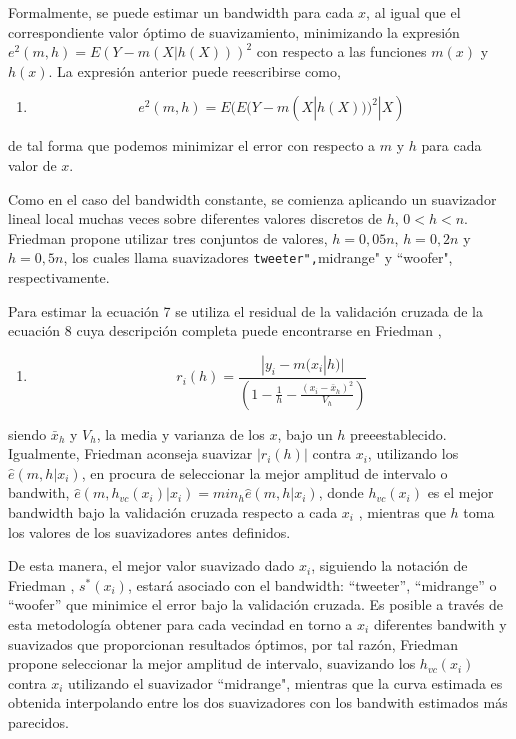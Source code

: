 \documentclass[
  12pt,
]{krantz}
\providecommand{\tightlist}{%
  \setlength{\itemsep}{0pt}\setlength{\parskip}{0pt}}
\begin{document}
Formalmente, se puede estimar un bandwidth para cada \(x\), al igual que el correspondiente valor óptimo de suavizamiento, minimizando la expresión \(e^{2}(m,h) = E(Y - m(X|h(X)))^2\) con respecto a las funciones \(m(x)\) y \(h(x)\). La expresión anterior puede reescribirse como,

\begin{enumerate}
\def\labelenumi{(\arabic{enumi})}
\setcounter{enumi}{6}
\tightlist
\item
  \[
  e^{2}(m,h) = E(E(Y - m(X|h(X)))^2|X)
  \]
\end{enumerate}

de tal forma que podemos minimizar el error con respecto a \(m\) y \(h\) para cada valor de \(x\).

Como en el caso del bandwidth constante, se comienza aplicando un suavizador lineal local muchas veces sobre diferentes valores discretos de \(h\), \(0 < h < n\). Friedman \cite{F} propone utilizar tres conjuntos de valores, \(h=0,05n\), \(h=0,2n\) y \(h=0,5n\), los cuales llama suavizadores \texttt{tweeter",}midrange" y ``woofer", respectivamente.

Para estimar la ecuación 7 se utiliza el residual de la validación cruzada de la ecuación 8 cuya descripción completa puede encontrarse en Friedman \cite{F},

\begin{enumerate}
\def\labelenumi{(\arabic{enumi})}
\setcounter{enumi}{7}
\tightlist
\item
  \[
   r_{i}(h)= \frac{|y_{i}-m(x_{i}|h)|}{\left(1-\frac{1}{h}-\frac{(x_{i}-\bar{x}_{h})^2}{V_{h}}\right)}  
  \]
\end{enumerate}

siendo \(\bar{x}_{h}\) y \(V_{h}\), la media y varianza de los \(x\), bajo un \(h\) preeestablecido. Igualmente, Friedman \cite{F} aconseja suavizar \(|r_{i}(h)|\) contra \(x_{i}\), utilizando los \(\hat{e}(m, h|x_{i})\), en procura de seleccionar la mejor amplitud de intervalo o bandwith, \(\hat{e}(m, h_{vc}(x_{i})|x_{i})=min_{h} \hat{e}(m, h|x_{i})\), donde \(h_{vc} (x_{i})\) es el mejor bandwidth bajo la validación cruzada respecto a cada \(x_{i}\) , mientras que \(h\) toma los valores de los suavizadores antes definidos.

De esta manera, el mejor valor suavizado dado \(x_{i}\), siguiendo la notación de Friedman \cite{F}, \(s^{*}(x_{i})\), estará asociado con el bandwidth: ``tweeter'', ``midrange'' o ``woofer'' que minimice el error bajo la validación cruzada. Es posible a través de esta metodología obtener para cada vecindad en torno a \(x_{i}\) diferentes bandwith y suavizados que proporcionan resultados óptimos, por tal razón, Friedman \cite{F} propone seleccionar la mejor amplitud de intervalo, suavizando los \(h_{vc} (x_{i})\) contra \(x_{i}\) utilizando el suavizador ``midrange", mientras que la curva estimada es obtenida interpolando entre los dos suavizadores con los bandwith estimados más parecidos.
\end{document}
